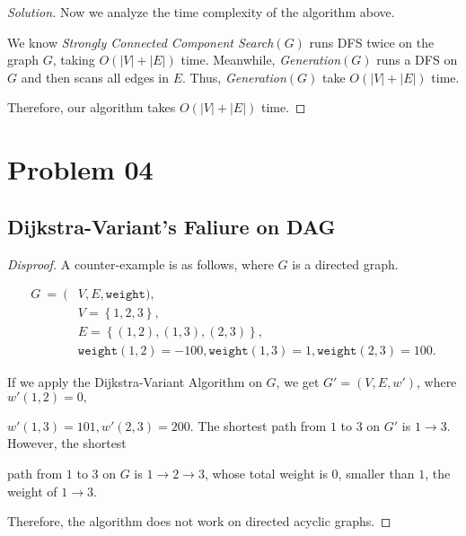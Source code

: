 \documentclass{article}
\newenvironment{solution}{\begin{proof}[\noindent\it Solution]}{\end{proof}}
\newenvironment{disproof}{\begin{proof}[\noindent\it Disproof]}{\end{proof}}
\begin{document}
\begin{solution}
    \vspace{-1em}
    \hspace{2.6em}
    Now we analyze the time complexity of the algorithm above.
    
    \hspace{2.6em}
    We know \textit{Strongly Connected Component Search}$(G)$ runs DFS twice on the graph $G$, taking $O(|V|+|E|)$ time. Meanwhile, \textit{Generation}$(G)$ runs a DFS on $G$ and then scans all edges in $E$. Thus, \textit{Generation}$(G)$ take $O(|V|+|E|)$ time.
    
    \hspace{2.6em}
    Therefore, our algorithm takes $O(|V|+|E|)$ time.
\end{solution}

\newpage

\section{Problem 04}
\vspace{1em}
\subsection{Dijkstra-Variant's Faliure on DAG}
\vspace{1em}
\begin{disproof}
    A counter-example is as follows, where $G$ is a directed graph.
    
    \vspace{-3em}
    \begin{align*}
        G\ = \ (&V,E,\mathtt{weight}), \\
        &V = \left\{1,2,3\right\}, \\
        &E = \left\{(1,2),(1,3),(2,3)\right\}, \\
        & \mathtt{weight}\left(1,2\right)=-100, \mathtt{weight}\left(1,3\right)=1, \mathtt{weight}\left(2,3\right)=100.
    \end{align*}
    
    \vspace{-1.2em} \hspace{2.6em}
    If we apply the Dijkstra-Variant Algorithm on $G$, we get $G'=(V,E,w')$, where $w'(1,2)=0,$
    
    $w'(1,3)=101, w'(2,3)=200.$ The shortest path from $1$ to $3$ on $G'$ is $1\rightarrow 3$. However, the shortest
    
    path from $1$ to $3$ on $G$ is $1\rightarrow 2\rightarrow 3$, whose total weight is $0$, smaller than $1$, the weight of $1\rightarrow 3.$
    
    \vspace{1em} \hspace{2.6em}
    Therefore, the algorithm does not work on directed acyclic graphs.
\end{disproof}
\end{document}
